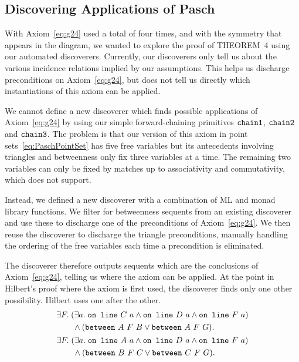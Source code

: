 \subsection{Discovering Applications of Pasch}\label{sec:PaschDiscoverer}
With Axiom~\ref{eq:g24} used a total of four times, and with the symmetry that appears in the diagram, we wanted to explore the proof of THEOREM~4 using our automated discoverers. Currently, our discoverers only tell us about the various incidence relations implied by our assumptions. This helps us discharge preconditions on Axiom~\ref{eq:g24}, but does not tell us directly which instantiations of this axiom can be applied.

We cannot define a new discoverer which finds possible applications of Axiom~\ref{eq:g24} by using our simple forward-chaining primitives $\texttt{chain1}$, $\texttt{chain2}$ and $\texttt{chain3}$. The problem is that our version of this axiom in point sets~\eqref{eq:PaschPointSet} has five free variables but its antecedents involving triangles and betweenness only fix three variables at a time. The remaining two variables can only be fixed by matches up to associativity and commutativity, which  does not support.

Instead, we defined a new discoverer  with a combination of ML and monad library functions. We filter for betweenness sequents from an existing discoverer and use these to discharge one of the preconditions of Axiom~\ref{eq:g24}. We then reuse the discoverer  to discharge the triangle preconditions, manually handling the ordering of the free variables each time a precondition is eliminated. 

The  discoverer therefore outputs sequents which are the conclusions of Axiom~\ref{eq:g24}, telling us where the axiom can be applied. At the point in Hilbert's proof where the axiom is first used, the discoverer finds only one other possibility. Hilbert uses one after the other.
\begin{gather*}
\begin{split}
&\exists F.\; (\exists a.\; \code{on\ line}\ C\ a \wedge \code{on\ line}\ D\ a \wedge \code{on\ line}\ F\ a)\\
&\qquad \wedge (\between{A}{F}{B} \vee \between{A}{F}{G}).
\end{split}\\
\begin{split}
&\exists F.\; (\exists a.\; \code{on\ line}\ A\ a \wedge \code{on\ line}\ D\ a \wedge \code{on\ line}\ F\ a)\\
&\qquad \wedge (\between{B}{F}{C} \vee \between{C}{F}{G}).
\end{split}
\end{gather*}

